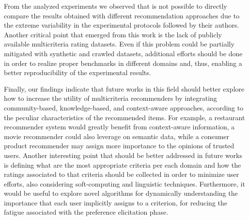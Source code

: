 From the analyzed experiments we observed that is not possible to directly compare the results obtained with different recommendation approaches due to the extreme variability in the experimental protocols followed by their authors. Another critical point that emerged from this work is the lack of publicly available multicriteria rating datasets. Even if this problem could be partially mitigated with synthetic and crawled datasets, additional efforts should be done in order to realize proper benchmarks in different domains and, thus, enabling a better reproducibility of the experimental results.

Finally, our findings indicate that future works in this field should better explore how to increase the utility of multicriteria recommenders by integrating community-based, knowledge-based, and context-aware approaches, according to the peculiar characteristics of the recommended items. For example, a restaurant recommender system would greatly benefit from context-aware information, a movie recommender could also leverage on semantic data, while a consumer product recommender may assign more importance to the opinions of trusted users. Another interesting point that should be better addressed in future works is defining what are the most appropriate criteria per each domain and how the ratings associated to that criteria should be collected in order to minimize user efforts, also considering soft-computing and linguistic techniques. Furthermore, it would be useful to explore novel algorithms for dynamically understanding the importance that each user implicitly assigns to a criterion, for reducing the fatigue associated with the preference elicitation phase.
